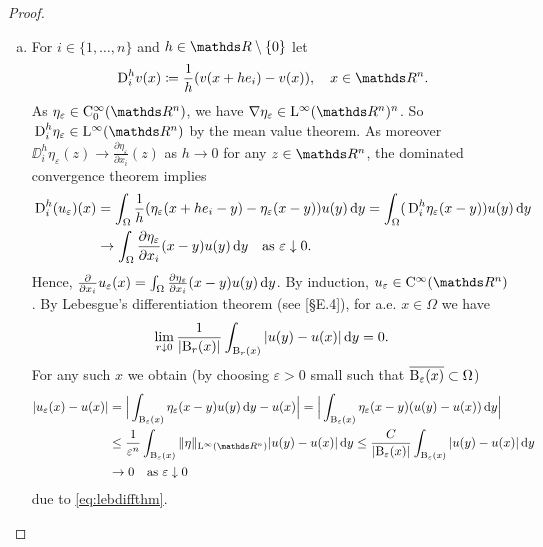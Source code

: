 \begin{proof}
  \begin{enumerate}[a)]
    \item For $i \in \{1, \dots, n\}$ and $h \in \R \setminus\{0\}$ let
    $$
    \DD^h_i v(x) \coloneqq \frac{1}{h} ( v(x + h e_i) - v(x)), \quad x \in \R^n.
    $$
    As $\eta_\varepsilon \in \CC_0^\infty(\R^n)$, we have $\nabla \eta_\varepsilon \in \Ell^\infty(\R^n)^n$.
    So $\DD_i^h  \eta_\varepsilon \in \Ell^\infty(\R^n)$ by the mean value theorem.
    As moreover $\DD_i^h \eta_\varepsilon(z) \to \frac{\partial \eta_\varepsilon}{\partial x_i}(z)$ as $h \to 0$ for any $z \in \R^n$, the dominated convergence theorem implies
    \begin{align*}
      \,{\operatorname{D}}_i^h (u_\varepsilon)(x)
    &= \int_\Omega \frac{1}{h} (\eta_\varepsilon(x + h e_i - y) - \eta_\varepsilon (x - y)) u(y) \, {\operatorname{d}\!{y}} 
    = \int_\Omega (\,{\operatorname{D}}_i^h \eta_\varepsilon (x - y)) u(y) \, {\operatorname{d}\!{y}}  \\
    &\to \int_\Omega \frac{\partial \eta_\varepsilon}{\partial x_i}(x - y) u(y) \, {\operatorname{d}\!{y}} \quad\text{as } \varepsilon \downarrow 0.
    \end{align*}
    Hence, $\frac{\partial}{\partial x_i} u_\varepsilon(x) = \int_\Omega \frac{\partial \eta_\varepsilon}{\partial x_i} (x - y) u(y) \, {\operatorname{d}\!{y}}$.
    By induction, $u_\varepsilon \in \CC^\infty(\R^n)$.
    By Lebesgue's differentiation theorem (see \cite{evans2010partial}[\S E.4]), for a.e. $x \in \Omega$ we have
    \begin{equation}
      \lim_{r \downarrow 0} \frac{1}{|\mathrm{B}_r(x)|} \int_{\mathrm{B}_r(x)} |u(y) - u(x)| \, {\operatorname{d}\!{y}} = 0.
      \label{eq:lebdiffthm}
    \end{equation}
    For any such $x$ we obtain (by choosing $\varepsilon > 0$ small such that $\overline{\mathrm{B}_\varepsilon(x)} \subset \Omega$)
    \begin{align}
      |u_\varepsilon(x) - u(x)|
      &= \Big| \int_{\BB_\varepsilon(x)} \eta_\varepsilon (x - y) u(y) \d y - u(x) \Big| 
      = \Big| \int_{\BB_\varepsilon(x)} \eta_\varepsilon (x - y) (u(y) - u(x)) \d y \Big| \nonumber\\
      &\leq \frac{1}{\varepsilon^n} \int_{\BB_\varepsilon(x)} \|\eta\|_{\Ell^\infty(\R^n)} |u(y) - u(x)| \d y \leq \frac{C}{|\BB_\varepsilon(x)|} \int_{\BB_\varepsilon(x)} |u(y) - u(x) | \d y \label{eq:pointwise}\\
      & \to 0 \quad\text{as } \varepsilon \downarrow 0 \nonumber
    \end{align}
    due to \eqref{eq:lebdiffthm}.
    

\end{enumerate}
\end{proof}

